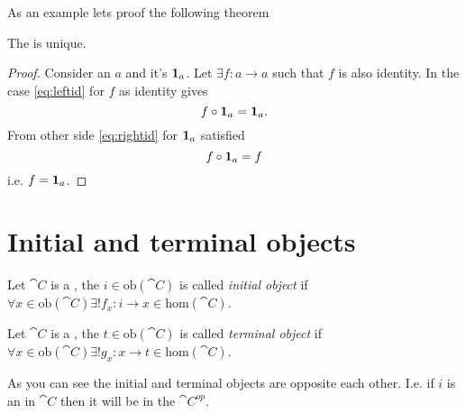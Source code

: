 As an example lets proof the following theorem
\begin{theorem}
\label{thm:identity_unique}
The  is unique.
\begin{proof}
Consider an  $a$ and it's  
$\idarrow[a]$. Let $\exists f: a \to a$ such that $f$ is also
identity. In the case \eqref{eq:leftid} for $f$ as identity gives
\[
f \circ \idarrow[a] = \idarrow[a].
\]
From other side \eqref{eq:rightid} for $\idarrow[a]$ satisfied
\[
f \circ \idarrow[a] = f
\]
i.e. $f = \idarrow[a]$.
\end{proof}
\end{theorem}

\section{Initial and terminal objects}
\begin{definition}
\label{def:initial_object}
Let $\cat{C}$ is a , the
 $i \in \mathrm{ob}(\cat{C})$ is called
\textit{initial object} if $\forall x \in \mathrm{ob}(\cat{C})
\exists! f_x: i \to x \in \mathrm{hom}(\cat{C})$.
\end{definition}

\begin{definition}
\label{def:terminal_object}
Let $\cat{C}$ is a , the
 $t \in \mathrm{ob}(\cat{C})$ is called
\textit{terminal object} if $\forall x \in \mathrm{ob}(\cat{C})
\exists! g_x: x \to t \in \mathrm{hom}(\cat{C})$.
\end{definition}

As you can see the initial and terminal objects are opposite each
other. I.e. if $i$ is an  in $\cat{C}$
then it will be  in
the  $\cat{C^{op}}$.

